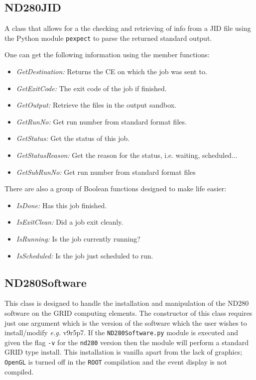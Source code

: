 \documentclass[11pt]{article}
\begin{document}
\subsection{ND280JID}

A class that allows for a the checking and retrieving of info from a
JID file using the Python module \verb+pexpect+ to parse the returned
standard output.

One can get the following information using the member functions: 

\begin{itemize}
\item{\textit{GetDestination:} Returns the CE on which the job was sent to.}
\item{\textit{GetExitCode:} The exit code of the job if finished.}
\item{\textit{GetOutput:} Retrieve the files in the output sandbox.}
\item{\textit{GetRunNo:} Get run number from standard format files.}
\item{\textit{GetStatus:} Get the status of this job.}
\item{\textit{GetStatusReason:} Get the reason for the status,
  i.e. waiting, scheduled...}
\item{\textit{GetSubRunNo:} Get run number from standard format files}
\end{itemize}

There are also a group of Boolean functions designed to make life
easier:

\begin{itemize}
\item{\textit{IsDone:} Has this job finished.}
\item{\textit{IsExitClean:} Did a job exit cleanly.}
\item{\textit{IsRunning:} Is the job currently running?}
\item{\textit{IsScheduled:} Is the job just scheduled to run.}
\end{itemize}

\subsection{ND280Software}
This class is designed to handle the installation and manipulation of
the ND280 software on the GRID computing elements. The constructor of
this class requires just one argument which is the version of the
software which the user wishes to install/modify \textit{e.g.} v9r5p7. If the
\verb+ND280Software.py+ module is executed and given the flag \verb+-v+ for the
\verb+nd280+ version then the module will perform a standard GRID type
install. This installation is vanilla apart from the lack of graphics;
\verb+OpenGL+ is turned off in the \verb+ROOT+ compilation and the
event display is not compiled.
\end{document}
